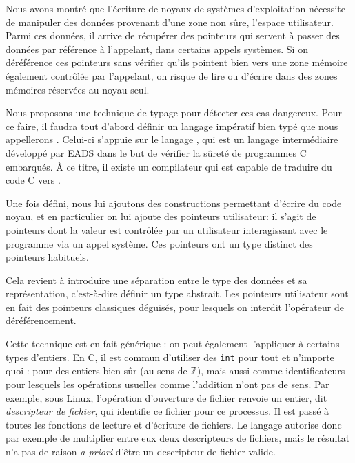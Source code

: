 
Nous avons montré que l'écriture de noyaux de systèmes d'exploitation nécessite
de manipuler des données provenant d'une zone non sûre, l'espace utilisateur.
Parmi ces données, il arrive de récupérer des pointeurs qui servent à passer des
données par référence à l'appelant, dans certains appels systèmes. Si on
déréférence ces pointeurs sans vérifier qu'ils pointent bien vers une zone
mémoire également contrôlée par l'appelant, on risque de lire ou d'écrire dans
des zones mémoires réservées au noyau seul.

Nous proposons une technique de typage pour détecter ces cas dangereux. Pour ce
faire, il faudra tout d'abord définir un langage impératif bien typé que nous
appellerons \langname.
Celui-ci s'appuie sur le langage \newspeak, qui est un langage intermédiaire
développé par EADS dans le but de vérifier la sûreté de programmes C embarqués.
À ce titre, il existe un compilateur qui est capable de traduire du code C vers
\newspeak.

Une fois \langname défini, nous lui ajoutons des constructions permettant
d'écrire du code noyau, et en particulier on lui ajoute des pointeurs
utilisateur: il s'agit de pointeurs dont la valeur est contrôlée par un
utilisateur interagissant avec le programme via un appel système. Ces pointeurs
ont un type distinct des pointeurs habituels.

Cela revient à introduire une séparation entre le type des données et sa
représentation, c'est-à-dire définir un type abstrait. Les pointeurs
utilisateur sont en fait des pointeurs classiques déguisés, pour lesquels on
interdit l'opérateur de déréférencement.

Cette technique est en fait générique : on peut également l'appliquer à certains
types d'entiers. En C, il est commun d'utiliser des \texttt{int} pour tout et
n'importe quoi : pour des entiers bien sûr (au sens de $ℤ$), mais aussi comme
identificateurs pour lesquels les opérations usuelles comme l'addition n'ont pas
de sens. Par exemple, sous Linux, l'opération d'ouverture de fichier renvoie un
entier, dit \emph{descripteur de fichier}, qui identifie ce fichier pour ce
processus. Il est passé à toutes les fonctions de lecture et d'écriture de
fichiers.
Le langage autorise donc par exemple de multiplier entre
eux deux descripteurs de fichiers, mais le résultat n'a pas de raison \emph{a
priori} d'être un descripteur de fichier valide.




